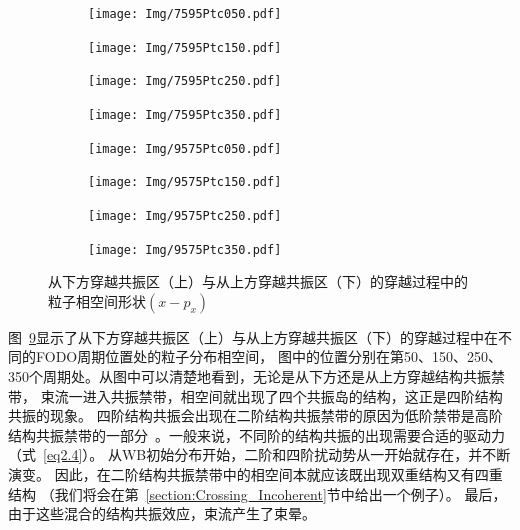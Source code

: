 \begin{figure}
    \centering
    \begin{subfigure}[b]{0.24\textwidth}
        \texttt{[image: Img/7595Ptc050.pdf]}
        \caption{}
        \label{sfig:75_95_ptc1}
    \end{subfigure}
    \begin{subfigure}[b]{0.24\textwidth}
        \texttt{[image: Img/7595Ptc150.pdf]}
        \caption{}
        \label{sfig:75_95_ptc2}
    \end{subfigure}
    \begin{subfigure}[b]{0.24\textwidth}
        \texttt{[image: Img/7595Ptc250.pdf]}
        \caption{}
        \label{sfig:75_95_ptc3}
    \end{subfigure}
    \begin{subfigure}[b]{0.24\textwidth}
        \texttt{[image: Img/7595Ptc350.pdf]}
        \caption{}
        \label{sfig:75_95_ptc4}
    \end{subfigure}

    \begin{subfigure}[b]{0.24\textwidth}
        \texttt{[image: Img/9575Ptc050.pdf]}
        \caption{}
        \label{sfig:95_75_ptc1}
    \end{subfigure}
    \begin{subfigure}[b]{0.24\textwidth}
        \texttt{[image: Img/9575Ptc150.pdf]}
        \caption{}
        \label{sfig:95_75_ptc2}
    \end{subfigure}
    \begin{subfigure}[b]{0.24\textwidth}
        \texttt{[image: Img/9575Ptc250.pdf]}
        \caption{}
        \label{sfig:95_75_ptc3}
    \end{subfigure}
    \begin{subfigure}[b]{0.24\textwidth}
        \texttt{[image: Img/9575Ptc350.pdf]}
        \caption{}
        \label{sfig:95_75_ptc4}
    \end{subfigure}
    \caption{从下方穿越共振区（上）与从上方穿越共振区（下）的穿越过程中的粒子相空间形状$(x-p_x)$}
    \label{fig:95_75_ptc}
\end{figure}

图~\ref{fig:95_75_ptc}显示了从下方穿越共振区（上）与从上方穿越共振区（下）的穿越过程中在不同的FODO周期位置处的粒子分布相空间，
图中的位置分别在第50、150、250、350个周期处。从图中可以清楚地看到，无论是从下方还是从上方穿越结构共振禁带，
束流一进入共振禁带，相空间就出现了四个共振岛的结构，这正是四阶结构共振的现象。
四阶结构共振会出现在二阶结构共振禁带的原因为低阶禁带是高阶结构共振禁带的一部分~\cite{11, 12}。一般来说，不同阶的结构共振的出现需要合适的驱动力（式~\ref{eq2.4}）。
从WB初始分布开始，二阶和四阶扰动势从一开始就存在，并不断演变。
因此，在二阶结构共振禁带中的相空间本就应该既出现双重结构又有四重结构 （我们将会在第~\ref{section:Crossing_Incoherent}节中给出一个例子）。
最后，由于这些混合的结构共振效应，束流产生了束晕。

